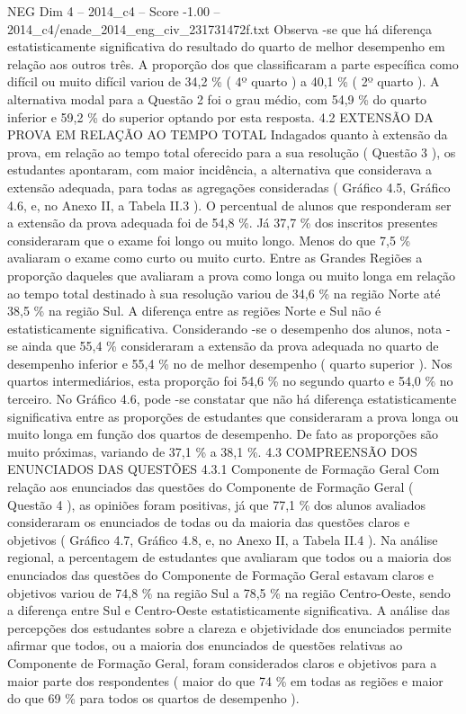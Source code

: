 \begin{textsample}{NEG Dim 4 – 2014\_c4 – Score -1.00 – 2014\_c4/enade\_2014\_eng\_civ\_231731472f.txt}
Observa -se que há diferença estatisticamente significativa do resultado do quarto de melhor desempenho em relação aos outros três.
A proporção dos que classificaram a parte específica como difícil ou muito difícil variou de 34,2 \% ( 4º quarto ) a 40,1 \% ( 2º quarto ).
A alternativa modal para a Questão 2 foi o grau médio, com 54,9 \% do quarto inferior e 59,2 \% do superior optando por esta resposta. 4.2 EXTENSÃO DA PROVA EM RELAÇÃO AO TEMPO TOTAL Indagados quanto à extensão da prova, em relação ao tempo total oferecido para a sua resolução ( Questão 3 ), os estudantes apontaram, com maior incidência, a alternativa que considerava a extensão adequada, para todas as agregações consideradas ( Gráfico 4.5, Gráfico 4.6, e, no Anexo II, a Tabela II.3 ).
O percentual de alunos que responderam ser a extensão da prova adequada foi de 54,8 \%.
Já 37,7 \% dos inscritos presentes consideraram que o exame foi longo ou muito longo.
Menos do que 7,5 \% avaliaram o exame como curto ou muito curto.
Entre as Grandes Regiões a proporção daqueles que avaliaram a prova como longa ou muito longa em relação ao tempo total destinado à sua resolução variou de 34,6 \% na região Norte até 38,5 \% na região Sul.
A diferença entre as regiões Norte e Sul não é estatisticamente significativa.
Considerando -se o desempenho dos alunos, nota -se ainda que 55,4 \% consideraram a extensão da prova adequada no quarto de desempenho inferior e 55,4 \% no de melhor desempenho ( quarto superior ).
Nos quartos intermediários, esta proporção foi 54,6 \% no segundo quarto e 54,0 \% no terceiro.
No Gráfico 4.6, pode -se constatar que não há diferença estatisticamente significativa entre as proporções de estudantes que consideraram a prova longa ou muito longa em função dos quartos de desempenho.
De fato as proporções são muito próximas, variando de 37,1 \% a 38,1 \%. 4.3 COMPREENSÃO DOS ENUNCIADOS DAS QUESTÕES 4.3.1 Componente de Formação Geral Com relação aos enunciados das questões do Componente de Formação Geral ( Questão 4 ), as opiniões foram positivas, já que 77,1 \% dos alunos avaliados consideraram os enunciados de todas ou da maioria das questões claros e objetivos ( Gráfico 4.7, Gráfico 4.8, e, no Anexo II, a Tabela II.4 ).
Na análise regional, a percentagem de estudantes que avaliaram que todos ou a maioria dos enunciados das questões do Componente de Formação Geral estavam claros e objetivos variou de 74,8 \% na região Sul a 78,5 \% na região Centro-Oeste, sendo a diferença entre Sul e Centro-Oeste estatisticamente significativa.
A análise das percepções dos estudantes sobre a clareza e objetividade dos enunciados permite afirmar que todos, ou a maioria dos enunciados de questões relativas ao Componente de Formação Geral, foram considerados claros e objetivos para a maior parte dos respondentes ( maior do que 74 \% em todas as regiões e maior do que 69 \% para todos os quartos de desempenho ).

\end{textsample}
